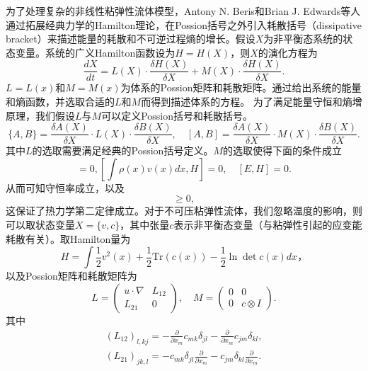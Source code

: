 为了处理复杂的非线性粘弹性流体模型，Antony N. Beris和Brian J. Edwards等人通过拓展经典力学的Hamilton理论，在Possion括号之外引入耗散括号（dissipative bracket）来描述能量的耗散和不可逆过程熵的增长\cite{edwards1990remarks,beris2013thermodynamics}。假设$X$为非平衡态系统的状态变量。系统的广义Hamilton函数设为$H=H(X)$，则$X$的演化方程为
\begin{equation*}
	\frac{dX}{dt} = L(X) \cdot \frac{\delta H(X)}{\delta X} + M(X) \cdot \frac{\delta H(X)}{\delta X} . 
\end{equation*}
$L=L(x)$和$M=M(x)$为体系的Possion矩阵和耗散矩阵。通过给出系统的能量和熵函数，并选取合适的$L$和$M$而得到描述体系的方程。 为了满足能量守恒和熵增原理，我们假设$L$与$M$可以定义Possion括号和耗散括号。
\begin{equation*}
	\{ A,B \} = \frac{\delta A(X)}{\delta X} \cdot L(X) \cdot \frac{\delta B(X)}{\delta X}, \quad  [ A,B ] = \frac{\delta A(X)}{\delta X} \cdot M(X) \cdot \frac{\delta B(X)}{\delta X}. 
\end{equation*}
其中$L$的选取需要满足经典的Possion括号定义。$M$的选取使得下面的条件成立
\begin{equation*}
	[\int \rho(x) dx, H]=0,[\int \rho(x) v(x) dx, H]=0, \quad [E,H] = 0.
\end{equation*}
从而可知守恒率成立，以及
\begin{equation*}
	[S,H] \ge 0,
\end{equation*}
这保证了热力学第二定律成立。对于不可压粘弹性流体，我们忽略温度的影响，则可以取状态变量$X= 
 \{v,c\}$，其中张量$c$表示非平衡态变量（与粘弹性引起的应变能耗散有关）。取Hamilton量为
 \begin{equation*}
 	H = \int \frac{1}{2} v^2(x) + \frac{1}{2} \mbox{
 	Tr}(c(x))- \frac{1}{2}  \ln \det c(x) dx，
 \end{equation*}
以及Possion矩阵和耗散矩阵为
\begin{equation*}
	L = \left( \begin{array}{cc} 
			u \cdot \nabla &  L_{12} \\
			L_{21}& 0
		\end{array}\right), \quad
	M =	\left( \begin{array}{cc} 
			0  & 0 \\
			0  & c \otimes I
		\end{array}\right).
\end{equation*}
其中
\begin{eqnarray*}
	(L_{12})_{l,kj} = - \frac{\partial}{\partial x_m} c_{mk} \delta_{jl} -  \frac{\partial}{\partial x_m} c_{jm} \delta_{kl}, \\
	(L_{21})_{jk,l} = -c_{mk} \delta_{jl} \frac{\partial}{\partial x_m} - c_{jm} \delta_{kl} \frac{\partial}{\partial x_m}.
\end{eqnarray*}
